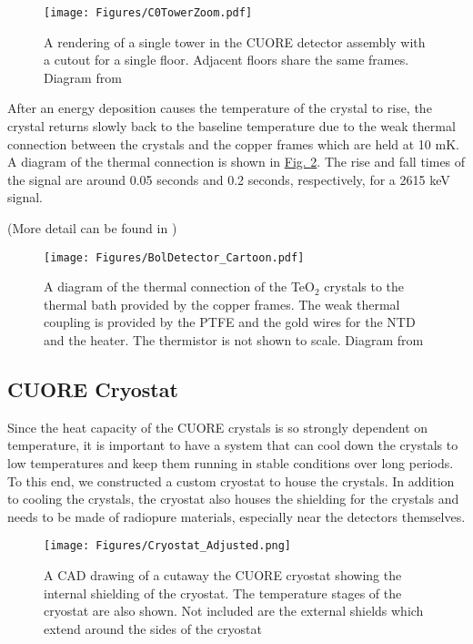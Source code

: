 \documentclass[12pt,a4paper]{article}
\begin{document}
\begin{figure}[htbp]
\centering
\texttt{[image: Figures/C0TowerZoom.pdf]}
\caption{A rendering of a single tower in the CUORE detector assembly with a cutout for a single floor. Adjacent floors share the same frames. Diagram from \cite{CUORE_DetectorPaper}}
\label{fig:SingleTowerWithZoom}
\end{figure}

After an energy deposition causes the temperature of the crystal to rise, the crystal returns slowly back to the baseline temperature due to the weak thermal connection between the crystals and the copper frames which are held at 10 mK. A diagram of the thermal connection is shown in \hyperref[fig:thermal_crystal_cartoon]{Fig. \ref*{fig:thermal_crystal_cartoon}}. The rise and fall times of the signal are around 0.05 seconds and 0.2 seconds, respectively, for a 2615 keV signal.

(\color{yellow}More detail can be found in \cite{CUORE_DetectorPaper}\color{black})

\begin{figure}[htbp]
\centering
\texttt{[image: Figures/BolDetector\_Cartoon.pdf]}
\caption{A diagram of the thermal connection of the TeO$_2$ crystals to the thermal bath provided by the copper frames. The weak thermal coupling is provided by the PTFE and the gold wires for the NTD and the heater. The thermistor is not shown to scale. Diagram from \cite{CUORE_DetectorPaper}}
\label{fig:thermal_crystal_cartoon}
\end{figure}



\subsection{CUORE Cryostat}

Since the heat capacity of the CUORE crystals is so strongly dependent on temperature, it is important to have a system that can cool down the crystals to low temperatures and keep them running in stable conditions over long periods. To this end, we constructed a custom cryostat to house the crystals. In addition to cooling the crystals, the cryostat also houses the shielding for the crystals and needs to be made of radiopure materials, especially near the detectors themselves.

\begin{figure}[p]
\centering
\texttt{[image: Figures/Cryostat\_Adjusted.png]}
\caption{A CAD drawing of a cutaway the CUORE cryostat showing the internal shielding of the cryostat. The temperature stages of the cryostat are also shown. Not included are the external shields which extend around the sides of the cryostat}
\label{fig:cryostat_cad_cutout}
\end{figure}
\end{document}

